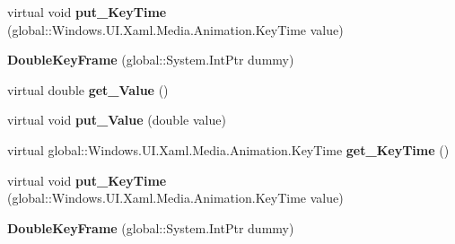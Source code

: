 \begin{DoxyCompactItemize}
virtual void {\bfseries put\+\_\+\+Key\+Time} (global\+::\+Windows.\+U\+I.\+Xaml.\+Media.\+Animation.\+Key\+Time value)
\item 
\mbox{\label{class_windows_1_1_u_i_1_1_xaml_1_1_media_1_1_animation_1_1_double_key_frame_a901b2c0f622bb7b0e3f8f1c92ef2e678}} 
{\bfseries Double\+Key\+Frame} (global\+::\+System.\+Int\+Ptr dummy)
\item 
\mbox{\label{class_windows_1_1_u_i_1_1_xaml_1_1_media_1_1_animation_1_1_double_key_frame_adc110c3fd704a81e10de729dc7620cbe}} 
virtual double {\bfseries get\+\_\+\+Value} ()
\item 
\mbox{\label{class_windows_1_1_u_i_1_1_xaml_1_1_media_1_1_animation_1_1_double_key_frame_ac8e9c608ef950cb4d594ab20df238c67}} 
virtual void {\bfseries put\+\_\+\+Value} (double value)
\item 
\mbox{\label{class_windows_1_1_u_i_1_1_xaml_1_1_media_1_1_animation_1_1_double_key_frame_aaa90bbff5cfbe24151ea9aa41a84bdc3}} 
virtual global\+::\+Windows.\+U\+I.\+Xaml.\+Media.\+Animation.\+Key\+Time {\bfseries get\+\_\+\+Key\+Time} ()
\item 
\mbox{\label{class_windows_1_1_u_i_1_1_xaml_1_1_media_1_1_animation_1_1_double_key_frame_a24618f65820c8ef09899ef7a3e13156f}} 
virtual void {\bfseries put\+\_\+\+Key\+Time} (global\+::\+Windows.\+U\+I.\+Xaml.\+Media.\+Animation.\+Key\+Time value)
\item 
\mbox{\label{class_windows_1_1_u_i_1_1_xaml_1_1_media_1_1_animation_1_1_double_key_frame_a901b2c0f622bb7b0e3f8f1c92ef2e678}} 
{\bfseries Double\+Key\+Frame} (global\+::\+System.\+Int\+Ptr dummy)
\item 
\mbox{\label{class_windows_1_1_u_i_1_1_xaml_1_1_media_1_1_animation_1_1_double_key_frame_adc110c3fd704a81e10de729dc7620cbe}} 

\end{DoxyCompactItemize}

